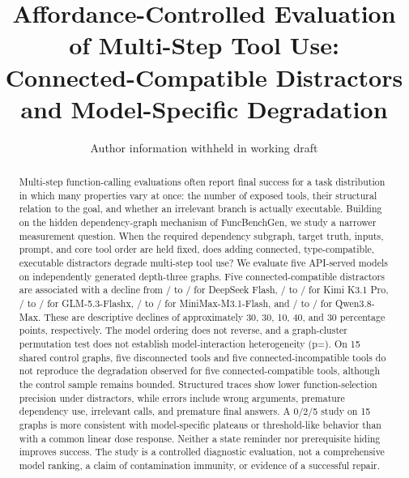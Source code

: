\documentclass[twoside,11pt,preprint]{article}
\begin{document}
\title{Affordance-Controlled Evaluation of Multi-Step Tool Use:\\
Connected-Compatible Distractors and Model-Specific Degradation}

\author{Author information withheld in working draft}

\maketitle

\begin{abstract}
Multi-step function-calling evaluations often report final success for a task
distribution in which many properties vary at once: the number of exposed tools,
their structural relation to the goal, and whether an irrelevant branch is
actually executable. Building on the hidden dependency-graph mechanism of
FuncBenchGen, we study a narrower measurement question. When the required
dependency subgraph, target truth, inputs, prompt, and core tool order are held
fixed, does adding connected, type-compatible, executable distractors degrade
multi-step tool use? We evaluate five API-served models on \MainGraphClusters{}
independently generated depth-three graphs. Five connected-compatible
distractors are associated with a decline from \DeepSeekBaseCorrect/\DeepSeekBaseTrials{}
to \DeepSeekDistCorrect/\DeepSeekDistTrials{} for DeepSeek Flash,
\KimiBaseCorrect/\KimiBaseTrials{} to \KimiDistCorrect/\KimiDistTrials{} for
Kimi K3.1 Pro, \GLMBaseCorrect/\GLMBaseTrials{} to
\GLMDistCorrect/\GLMDistTrials{} for GLM-5.3-Flashx,
\MiniMaxBaseCorrect/\MiniMaxBaseTrials{} to
\MiniMaxDistCorrect/\MiniMaxDistTrials{} for MiniMax-M3.1-Flash, and
\QwenBaseCorrect/\QwenBaseTrials{} to \QwenDistCorrect/\QwenDistTrials{} for
Qwen3.8-Max. These are descriptive declines of approximately 30, 30, 10, 40, and 30
percentage points, respectively. The model ordering does not reverse, and a
graph-cluster permutation test does not establish model-interaction
heterogeneity (p=\InteractionP). On 15 shared control graphs, five
disconnected tools and five connected-incompatible tools do not reproduce the
degradation observed for five connected-compatible tools, although the control
sample remains bounded. Structured traces show lower function-selection precision under
distractors, while errors include wrong arguments, premature dependency use,
irrelevant calls, and premature final answers. A 0/2/5 study on 15 graphs is more
consistent with model-specific plateaus or threshold-like behavior than with a
common linear dose response. Neither a state reminder nor prerequisite hiding
improves success. The study is a controlled diagnostic evaluation, not a
comprehensive model ranking, a claim of contamination immunity, or evidence of a
successful repair.
\end{abstract}
\end{document}
